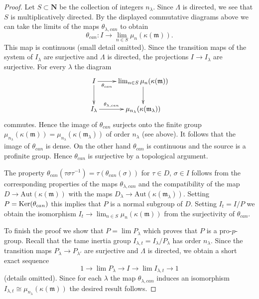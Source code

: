 \begin{proof}
\medskip\noindent
Let $S \subset \mathbf{N}$ be the collection of integers $n_\lambda$.
Since $\Lambda$ is directed, we see that $S$ is multiplicatively directed.
By the displayed commutative diagrams above we can take the limits of
the maps $\theta_{\lambda, can}$ to obtain
$$
\theta_{can} : I \to \lim_{n \in S} \mu_n(\kappa(\mathfrak m)).
$$
This map is continuous (small detail omitted). Since the transition maps
of the system of $I_\lambda$ are surjective
and $\Lambda$ is directed, the projections $I \to I_\lambda$
are surjective. For every $\lambda$ the diagram
$$
\xymatrix{
I \ar[d] \ar[r]_-{\theta_{can}} &
\lim_{n \in S} \mu_n(\kappa(\mathfrak m)) \ar[d] \\
I_{\lambda} \ar[r]^-{\theta_{\lambda, can}} &
\mu_{n_\lambda}(\kappa(\mathfrak m_\lambda))
}
$$
commutes. Hence the image of $\theta_{can}$ surjects onto the finite group
$\mu_{n_\lambda}(\kappa(\mathfrak m)) =
\mu_{n_\lambda}(\kappa(\mathfrak m_\lambda))$ of order $n_\lambda$
(see above). It follows that the image of $\theta_{can}$ is dense.
On the other hand $\theta_{can}$ is continuous and the
source is a profinite group. Hence $\theta_{can}$ is surjective
by a topological argument.

\medskip\noindent
The property $\theta_{can}(\tau \sigma \tau^{-1}) = \tau(\theta_{can}(\sigma))$
for $\tau \in D$, $\sigma \in I$ follows from the corresponding properties
of the maps $\theta_{\lambda, can}$ and the compatibility of the map
$D \to \text{Aut}(\kappa(\mathfrak m))$ with the maps
$D_\lambda \to \text{Aut}(\kappa(\mathfrak m_\lambda))$.
Setting $P = \mathop{\mathrm{Ker}}(\theta_{can})$ this implies
that $P$ is a normal subgroup of $D$. Setting $I_t = I/P$
we obtain the isomorphism $I_t \to \lim_{n \in S} \mu_n(\kappa(\mathfrak m))$
from the surjectivity of $\theta_{can}$.

\medskip\noindent
To finish the proof we show that $P = \lim P_\lambda$ which proves
that $P$ is a pro-$p$-group. Recall that the tame inertia group
$I_{\lambda, t} = I_\lambda/P_\lambda$ has order $n_\lambda$.
Since the transition maps $P_\lambda \to P_{\lambda'}$ are surjective
and $\Lambda$ is directed, we obtain a short exact sequence
$$
1 \to \lim P_\lambda \to I \to \lim I_{\lambda, t} \to 1
$$
(details omitted). Since for each $\lambda$ the map $\theta_{\lambda, can}$
induces an isomorphism
$I_{\lambda, t} \cong \mu_{n_\lambda}(\kappa(\mathfrak m))$
the desired result follows.
\end{proof}

